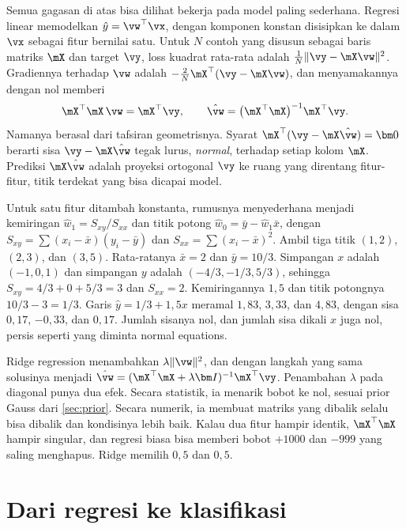 Semua gagasan di atas bisa dilihat bekerja pada model paling sederhana. Regresi linear memodelkan $\hat y=\vw^\top\vx$,
dengan komponen konstan disisipkan ke dalam $\vx$ sebagai fitur bernilai satu. Untuk $N$ contoh yang disusun sebagai baris
matriks $\mX$ dan target $\vy$, loss kuadrat rata-rata adalah $\tfrac1N\|\vy-\mX\vw\|^2$. Gradiennya terhadap $\vw$ adalah
$-\tfrac2N\mX^\top(\vy-\mX\vw)$, dan menyamakannya dengan nol memberi 
\begin{equation}
\mX^\top\mX\,\vw=\mX^\top\vy,\qquad \hat\vw=\big(\mX^\top\mX\big)^{-1}\mX^\top\vy .
\end{equation}
Namanya berasal dari tafsiran geometrisnya. Syarat $\mX^\top(\vy-\mX\hat\vw)=\bm0$ berarti sisa $\vy-\mX\hat\vw$ tegak lurus,
\emph{normal}, terhadap setiap kolom $\mX$. Prediksi $\mX\hat\vw$ adalah proyeksi ortogonal $\vy$ ke ruang yang direntang
fitur-fitur, titik terdekat yang bisa dicapai model.

Untuk satu fitur ditambah konstanta, rumusnya menyederhana menjadi kemiringan $\hat w_1=S_{xy}/S_{xx}$ dan titik potong
$\hat w_0=\bar y-\hat w_1\bar x$, dengan $S_{xy}=\sum(x_i-\bar x)(y_i-\bar y)$ dan $S_{xx}=\sum(x_i-\bar x)^2$. Ambil tiga titik
$(1,2)$, $(2,3)$, dan $(3,5)$. Rata-ratanya $\bar x=2$ dan $\bar y=10/3$. Simpangan $x$ adalah $(-1,0,1)$ dan simpangan $y$
adalah $(-4/3,-1/3,5/3)$, sehingga $S_{xy}=4/3+0+5/3=3$ dan $S_{xx}=2$. Kemiringannya $1{,}5$ dan titik potongnya
$10/3-3=1/3$. Garis $\hat y=1/3+1{,}5x$ meramal $1{,}83$, $3{,}33$, dan $4{,}83$, dengan sisa $0{,}17$, $-0{,}33$, dan $0{,}17$.
Jumlah sisanya nol, dan jumlah sisa dikali $x$ juga nol, persis seperti yang diminta normal equations.

Ridge regression menambahkan $\lambda\|\vw\|^2$, dan dengan langkah yang sama solusinya menjadi
$\hat\vw=(\mX^\top\mX+\lambda\bm I)^{-1}\mX^\top\vy$. Penambahan $\lambda$ pada diagonal punya dua efek. Secara statistik, ia
menarik bobot ke nol, sesuai prior Gauss dari \cref{sec:prior}. Secara numerik, ia membuat matriks yang dibalik selalu bisa
dibalik dan kondisinya lebih baik. Kalau dua fitur hampir identik, $\mX^\top\mX$ hampir singular, dan regresi biasa bisa
memberi bobot $+1000$ dan $-999$ yang saling menghapus. Ridge memilih $0{,}5$ dan $0{,}5$.

\section{Dari regresi ke klasifikasi}

